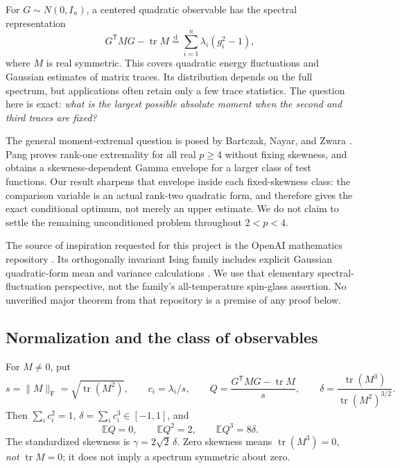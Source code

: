 \documentclass[11pt]{article}
\numberwithin{equation}{section}
\theoremstyle{definition}
\theoremstyle{remark}
\newcommand{\E}{\mathbb E}
\newcommand{\tr}{\operatorname{tr}}
\newcommand{\Frob}{\mathrm F}
\newcommand{\eqd}{\overset{\mathrm d}=}
\begin{document}
For $G\sim N(0,I_n)$, a centered quadratic observable has the spectral representation
\begin{equation}\label{eq:matrix-model}
G^{\mathsf T}MG-\tr M\eqd\sum_{i=1}^n\lambda_i(g_i^2-1),
\end{equation}
where $M$ is real symmetric. This covers quadratic energy fluctuations and Gaussian estimates of matrix traces. Its distribution depends on the full spectrum, but applications often retain only a few trace statistics. The question here is exact: \emph{what is the largest possible absolute moment when the second and third traces are fixed?}

The general moment-extremal question is posed by Bartczak, Nayar, and Zwara \cite{BNZ2021}. Pang \cite{Pang2026} proves rank-one extremality for all real $p\geq4$ without fixing skewness, and obtains a skewness-dependent Gamma envelope for a larger class of test functions. Our result sharpens that envelope inside each fixed-skewness class: the comparison variable is an actual rank-two quadratic form, and therefore gives the exact conditional optimum, not merely an upper estimate. We do not claim to settle the remaining unconditioned problem throughout $2<p<4$.

The source of inspiration requested for this project is the OpenAI mathematics repository \cite{OpenAIRepository}. Its orthogonally invariant Ising family includes explicit Gaussian quadratic-form mean and variance calculations \cite{OpenAIGaussian}. We use that elementary spectral-fluctuation perspective, not the family's all-temperature spin-glass assertion. No unverified major theorem from that repository is a premise of any proof below.

\subsection{Normalization and the class of observables}
For $M\ne0$, put
\begin{equation}\label{eq:normalization}
s=\|M\|_{\Frob}=\sqrt{\tr(M^2)},\qquad
c_i=\lambda_i/s,\qquad
Q=\frac{G^{\mathsf T}MG-\tr M}{s},\qquad
\delta=\frac{\tr(M^3)}{\tr(M^2)^{3/2}}.
\end{equation}
Then $\sum_i c_i^2=1$, $\delta=\sum_i c_i^3\in[-1,1]$, and
\begin{equation}\label{eq:first-three}
\E Q=0,\qquad \E Q^2=2,\qquad \E Q^3=8\delta.
\end{equation}
The standardized skewness is $\gamma=2\sqrt2\,\delta$. Zero skewness means $\tr(M^3)=0$, \emph{not} $\tr M=0$; it does not imply a spectrum symmetric about zero.
\end{document}
